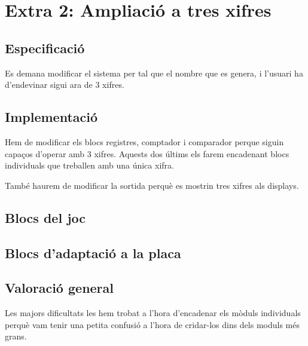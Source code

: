 \chapter{Extra 2: Ampliació a tres xifres}

\section{Especificació}

Es demana modificar el sistema per tal que el nombre que es genera,
i l'usuari ha d'endevinar sigui ara de 3 xifres.

\section{Implementació}

Hem de modificar els blocs \textsf{registres}, \textsf{comptador} i \textsf{comparador} perque siguin capaços d'operar amb 3 xifres.
Aquests dos últims els farem encadenant blocs individuals que treballen amb una única xifra.

També haurem de modificar la sortida perquè es mostrin tres xifres als displays.

\section{Blocs del joc}

\section{Blocs d'adaptació a la placa}

\section{Valoració general}

Les majors dificultats les hem trobat a l'hora d'encadenar els mòduls individuals perquè vam tenir una petita confusió a l'hora de cridar-los dins dels moduls més grans.
